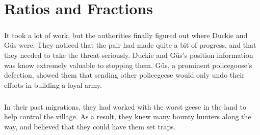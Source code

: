 \chapter{Ratios and Fractions}
\paragraph{} It took a lot of work, but the authorities finally figured out where Duckie and G{\"u}s were. They noticed that the pair had made quite a bit of progress, and that they needed to take the threat seriously. Duckie and G{\"u}s's position information was know extremely valuable to stopping them. G{\"u}s, a prominent policegoose's defection, showed them that sending other policegeese would only undo their efforts in building a loyal army.  
\paragraph{} In their past migrations, they had worked with the worst geese in the land to help control the village. As a result, they knew many bounty hunters along the way, and believed that they could have them set traps. 

